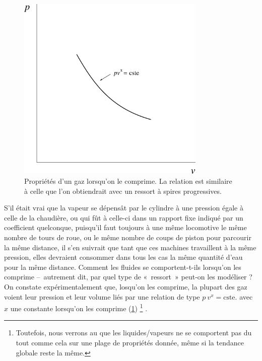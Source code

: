		\begin{figure}
			\begin{center}
			\includegraphics[width=9cm]{images/pv_gaz_simple.png}
			\end{center}
			\caption{Propriétés d’un gaz lorsqu’on le comprime. La relation est similaire à celle que l’on obtiendrait avec un ressort à spires progressives.}
			\label{fig_p-v_pvx}
		\end{figure}

			S’il était vrai que la vapeur se dépensât par le cylindre à une pression égale à celle de la chaudière, ou qui fût à celle-ci dans un rapport fixe indiqué par un coefficient quelconque, puisqu’il faut toujours à une même locomotive le même nombre de tours de roue, ou le même nombre de coups de piston pour parcourir la même distance, il s’en suivrait que tant que ces machines travaillent à la même pression, elles devraient consommer dans tous les cas la même quantité d’eau pour la même distance.
		Comment les fluides se comportent-t-ils lorsqu’on les comprime --\ autrement dit, par quel type de «~ressort~» peut-on les modéliser ? On constate expérimentalement que, losqu’on les comprime, la plupart des gaz voient leur pression et leur volume liés par une relation de type $p\ v^{x} = \text{cste.}$ avec $x$ une constante lorsqu’on les comprime (\cref{fig_p-v_pvx})%
			\footnote{Toutefois, nous verrons au \courscinqshort que les liquides/vapeurs ne se comportent pas du tout comme cela sur une plage de propriétés donnée, même si la tendance globale reste la même.}%
		.

